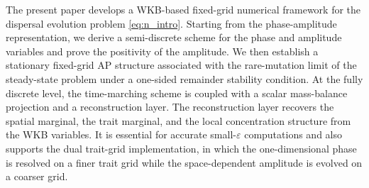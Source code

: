 \documentclass[11pt]{article}
\begin{document}
The present paper develops a WKB-based fixed-grid numerical framework for the
dispersal evolution problem \eqref{eq:n_intro}.  Starting from the
phase-amplitude representation, we derive a semi-discrete scheme for the phase
and amplitude variables and prove the positivity of the amplitude.  We then
establish a stationary fixed-grid AP structure associated with the
rare-mutation limit of the steady-state problem under a one-sided remainder
stability condition.  
At the fully discrete level, the time-marching scheme is
coupled with a scalar mass-balance projection and a reconstruction layer.  The
reconstruction layer recovers the spatial marginal, the trait marginal, and the
local concentration structure from the WKB variables.  
It is essential for
accurate small-\(\varepsilon\) computations and also supports the dual
trait-grid implementation, in which the one-dimensional phase is resolved on a
finer trait grid while the space-dependent amplitude is evolved on a coarser
grid.


%
\end{document}
